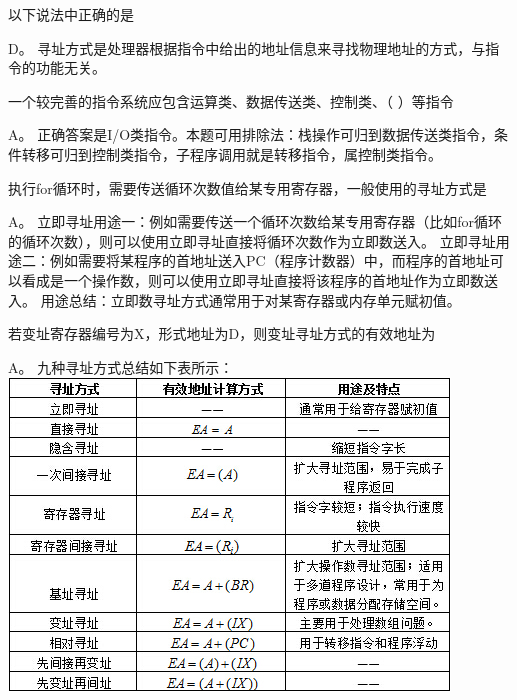 \question 以下说法中正确的是
\par{}
\begin{solution}D。
寻址方式是处理器根据指令中给出的地址信息来寻找物理地址的方式，与指令的功能无关。
\end{solution}
\question 一个较完善的指令系统应包含运算类、数据传送类、控制类、（ ）等指令
\par{}
\begin{solution}A。
正确答案是I/O类指令。本题可用排除法：栈操作可归到数据传送类指令，条件转移可归到控制类指令，子程序调用就是转移指令，属控制类指令。
\end{solution}
\question 执行for循环时，需要传送循环次数值给某专用寄存器，一般使用的寻址方式是
\par{}
\begin{solution}A。
立即寻址用途一：例如需要传送一个循环次数给某专用寄存器（比如for循环的循环次数），则可以使用立即寻址直接将循环次数作为立即数送入。
立即寻址用途二：例如需要将某程序的首地址送入PC（程序计数器）中，而程序的首地址可以看成是一个操作数，则可以使用立即寻址直接将该程序的首地址作为立即数送入。
用途总结：立即数寻址方式通常用于对某寄存器或内存单元赋初值。
\end{solution}
\question 若变址寄存器编号为X，形式地址为D，则变址寻址方式的有效地址为
\par{}
\begin{solution}A。 九种寻址方式总结如下表所示：
\includegraphics[width=4.61458in,height=3.28125in]{computerassets/87b5c054d339fca75d9d85ad9c016aff.jpeg}
\end{solution}
